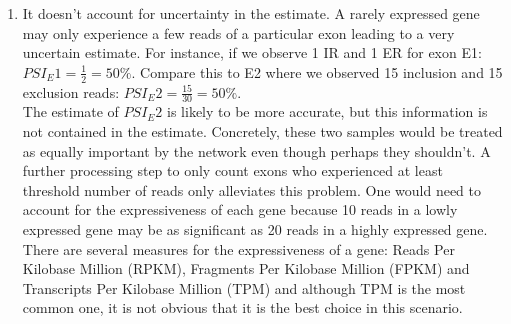 \begin{enumerate}
	\item It doesn't account for uncertainty in the estimate. A rarely expressed gene may only experience a few reads of a particular exon leading to a very uncertain estimate. For instance, if we observe 1 IR and 1 ER for exon E1: $PSI_E1 = \frac{1}{2} = 50\%$. Compare this to E2 where we observed 15 inclusion and 15 exclusion reads: $PSI_E2 = \frac{15}{30} = 50\%$.\\
	The estimate of $PSI_E2$ is likely to be more accurate, but this information is not contained in the estimate. Concretely, these two samples would be treated as equally important by the network even though perhaps they shouldn't.
	A further processing step to only count exons who experienced at least threshold number of reads only alleviates this problem. One would need to account for the expressiveness of each gene because 10 reads in a lowly expressed gene may be as significant as 20 reads in a highly expressed gene. There are several measures for the expressiveness of a gene: Reads Per Kilobase Million (RPKM), Fragments Per Kilobase Million (FPKM) and Transcripts Per Kilobase Million (TPM) and although TPM is the most common one, it is not obvious that it is the best choice in this scenario.
	
	

\end{enumerate}
